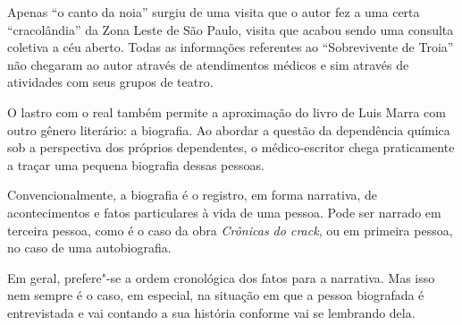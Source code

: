 Apenas ``o canto da noia'' surgiu de uma visita que o autor fez a uma
certa ``cracolândia'' da Zona Leste de São Paulo, visita que acabou sendo uma
consulta coletiva a céu aberto.
Todas as informações referentes ao ``Sobrevivente de Troia''
não chegaram ao autor através de atendimentos médicos e sim através de atividades com
seus grupos de teatro.

O lastro com o real também permite a aproximação do livro de Luis Marra com outro gênero literário: a biografia. Ao abordar a questão da dependência
química sob a perspectiva dos próprios dependentes, o médico-escritor chega praticamente a traçar uma pequena biografia dessas pessoas.

Convencionalmente, a biografia é o registro, em forma narrativa, de acontecimentos e fatos
particulares à vida de uma pessoa. Pode ser narrado em terceira pessoa,
como é o caso da obra \textit{Crônicas do crack}, ou em primeira pessoa, no caso de uma
autobiografia.

Em geral, prefere"-se a ordem cronológica dos fatos para a narrativa. Mas
isso nem sempre é o caso, em especial, na situação em que a pessoa
biografada é entrevistada e vai contando a sua história conforme vai se
lembrando dela.


